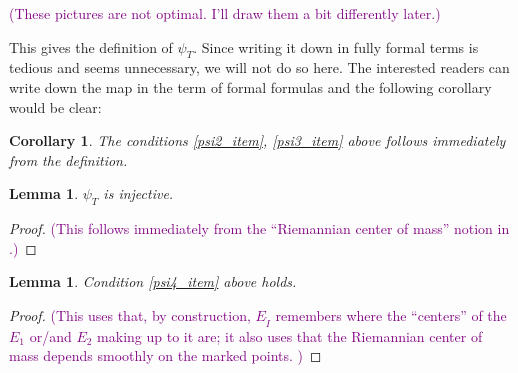 \documentclass[11pt]{article}
\newtheorem{lmm}[thm]{Lemma}
\newtheorem{crl}[thm]{Corollary}
\theoremstyle{definition}
\theoremstyle{remark}
\def\mr#1{{\mathring{#1}}}
\def\cmt#1{\textcolor{purple}{(#1)}}
\begin{document}
\cmt{These pictures are not optimal. I'll draw them a bit differently later.}
 
This gives the definition of $\psi_T$. Since writing it down in fully formal terms is tedious and seems unnecessary, we will not do so here. 
The interested readers can write down the map in the term of formal formulas and the following corollary would be clear:  

\begin{crl}
The conditions \ref{psi2_item}, \ref{psi3_item} above follows immediately from the definition. 
\end{crl}

\begin{lmm}
$\psi_T$ is injective. 
\end{lmm}
\begin{proof}
\cmt{This follows immediately from the ``Riemannian center of mass'' notion in \cite{GroveKarcher}.}
\end{proof}

\begin{lmm}%
Condition \ref{psi4_item} above holds.
\end{lmm}

\begin{proof}
\cmt{This uses that, by construction, $E_{\mr{I}}$ remembers where the ``centers'' of the $E_1$ or/and $E_2$ making up to it are; it also uses that the Riemannian center of mass depends smoothly on the marked points. }
\end{proof}
\end{document}
